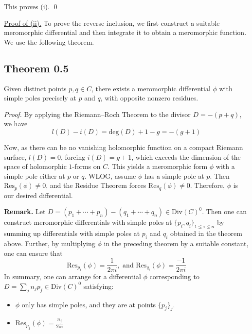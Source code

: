 \documentclass[11pt,a4paper]{article}
\begin{document}
This proves (i).
\qed

\underline{Proof of (ii).} To prove the reverse inclusion, we first construct a suitable meromorphic differential and then integrate it to obtain a meromorphic function. We use the following theorem.

\subsection*{Theorem 0.5} Given distinct points $p, q \in C$, there exists a meromorphic differential $\phi$ with simple poles precisely at $p$ and $q$, with opposite nonzero residues.


\textit{Proof.}
    By applying the Riemann--Roch Theorem to the divisor $D = -(p+q)$, we have
    $$l(D) - i(D) = \text{deg}(D) + 1 - g = -(g+1)$$

    Now, as there can be no vanishing holomorphic function on a compact Riemann surface, $l(D) = 0$, forcing $i(D) = g+1$, which exceeds the dimension of the space of holomorphic $1$-forms on $C$. This yields a meromorphic form $\phi$ with a simple pole either at $p$ or $q$. WLOG, assume $\phi$ has a simple pole at $p$. Then $\text{Res}_p(\phi) \neq 0$, and the Residue Theorem forces $\text{Res}_q(\phi) \neq 0$. Therefore, $\phi$ is our desired differential.

\textbf{Remark.} Let $D = (p_1 +\cdots + p_n) - (q_1 +\cdots + q_n) \in \text{Div}(C)^0$. Then one can construct meromorphic differentials with simple poles at $\{p_i, q_i\}_{1\leq i\leq n}$ by summing up differentials with simple poles at $p_i$ and $q_i$ obtained in the theorem above. Further, by multiplying $\phi$ in the preceding theorem by a suitable constant, one can ensure that $$\text{Res}_{p_i}(\phi) = \frac{1}{2\pi i}, \text{ and } \text{Res}_{q_i}(\phi) = \frac{-1}{2\pi i}$$
In summary, one can arrange for a differential $\phi$ corresponding to $D = \sum_jn_jp_j \in \text{Div}(C)^0$ satisfying:
\begin{itemize}
    \item $\phi$ only has simple poles, and they are at points $\{p_j\}_j$.
    \item $\text{Res}_{p_j}(\phi) = \frac{n_j}{2\pi i}$
\end{itemize}
\end{document}
